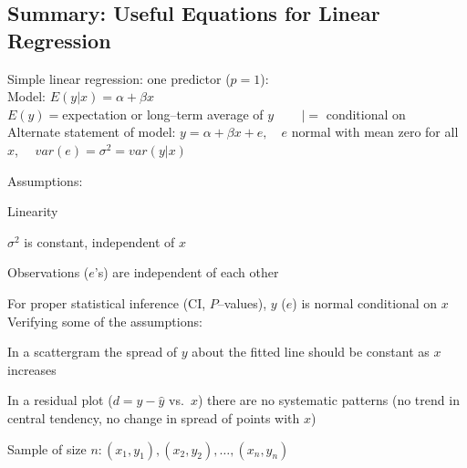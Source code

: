 \subsection{Summary: Useful Equations for Linear Regression}
Simple linear regression: one predictor ($p=1$): \\
Model:	$E(y|x) = \alpha + \beta x$ \\ $E(y) = $expectation or long--term
	average of $y$ ~~~ $| = $ conditional on \\
Alternate statement of model:	$y = \alpha + \beta x + e,\quad e$
normal with mean zero for all $x$, $\quad var(e) = \sigma^{2} = var(y
| x)$

Assumptions:
\be
\item	Linearity
\item	$\sigma^2$ is constant, independent of $x$
\item	Observations ($e$'s) are independent of each other
\item	For proper statistical inference (CI, $P$--values), $y$ ($e$)
		is normal conditional on $x$
\ee
Verifying some of the assumptions:
\be
\item	In a scattergram the spread of $y$ about the fitted line
		should be constant as $x$ increases
\item	In a residual plot ($d = y - \hat{y}$ vs.\ $x$) there are no
		systematic patterns (no trend in central tendency, no change
		in spread of points with $x$)
\ee

Sample of size $n: (x_{1}, y_{1}), (x_{2}, y_{2}), \ldots, (x_{n},y_{n})$

